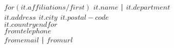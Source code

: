 $for(it.affiliations/first)$
\bfseries{$it.name$ | $it.department$}
\\$it.address$ $it.city$ $it.postal-code$
\\$it.country$$endfor$
\\$fromtelephone$
\\$fromemail$ | $fromurl$
